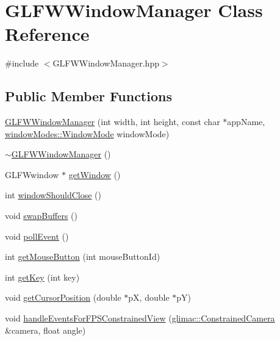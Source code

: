 \hypertarget{class_g_l_f_w_window_manager}{}\section{G\+L\+F\+W\+Window\+Manager Class Reference}
\label{class_g_l_f_w_window_manager}


{\ttfamily \#include $<$G\+L\+F\+W\+Window\+Manager.\+hpp$>$}

\subsection*{Public Member Functions}
\begin{DoxyCompactItemize}
\item 
\hyperlink{class_g_l_f_w_window_manager_a137231d0368f438f0a053c763078f397}{G\+L\+F\+W\+Window\+Manager} (int width, int height, const char $\ast$app\+Name, \hyperlink{namespacewindow_modes_ad00676c38b0aa6cac2c15a7d3a8748e4}{window\+Modes\+::\+Window\+Mode} window\+Mode)
\item 
\hyperlink{class_g_l_f_w_window_manager_a3e5bc2c912c04fce110f034fa779957c}{$\sim$\+G\+L\+F\+W\+Window\+Manager} ()
\item 
G\+L\+F\+Wwindow $\ast$ \hyperlink{class_g_l_f_w_window_manager_a5e1013598a0231e8d007302bde7530f1}{get\+Window} ()
\item 
int \hyperlink{class_g_l_f_w_window_manager_a9e0b406a5a51f6eab704a3a040699754}{window\+Should\+Close} ()
\item 
void \hyperlink{class_g_l_f_w_window_manager_aa142a9ea2b49460c3992a5f706b22579}{swap\+Buffers} ()
\item 
void \hyperlink{class_g_l_f_w_window_manager_a9f79fd3595b9681b04898ef0e11e10bd}{poll\+Event} ()
\item 
int \hyperlink{class_g_l_f_w_window_manager_aee22f247d0e79d1f51a4eed39b0b90e6}{get\+Mouse\+Button} (int mouse\+Button\+Id)
\item 
int \hyperlink{class_g_l_f_w_window_manager_add348ae1a74b7d33d18df173277859d2}{get\+Key} (int key)
\item 
void \hyperlink{class_g_l_f_w_window_manager_a5b283783f61366b19b3270d8fa7020f0}{get\+Cursor\+Position} (double $\ast$pX, double $\ast$pY)
\item 
void \hyperlink{class_g_l_f_w_window_manager_ac42e3f0fbc9f348b37b50a3cbb3a0205}{handle\+Events\+For\+F\+P\+S\+Constrained\+View} (\hyperlink{classglimac_1_1_constrained_camera}{glimac\+::\+Constrained\+Camera} \&camera, float angle)
\end{DoxyCompactItemize}


